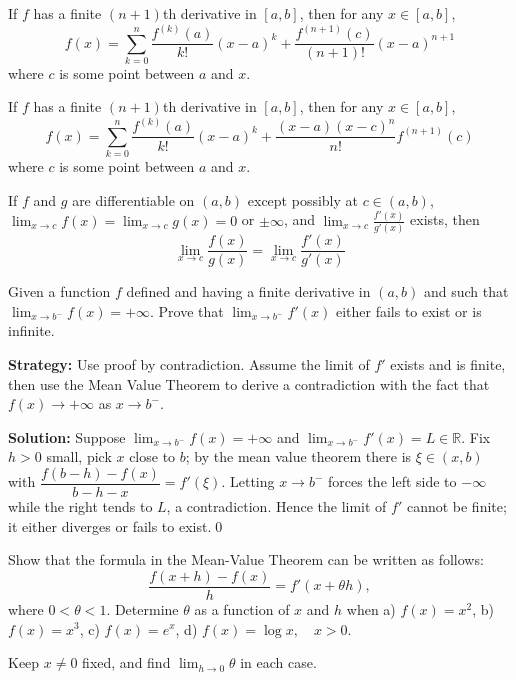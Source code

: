 \begin{theorem}
If $f$ has a finite $(n+1)$th derivative in $[a,b]$, then for any $x \in [a,b]$,
\[ f(x) = \sum_{k=0}^{n} \frac{f^{(k)}(a)}{k!} (x-a)^k + \frac{f^{(n+1)}(c)}{(n+1)!} (x-a)^{n+1} \]
where $c$ is some point between $a$ and $x$.
\end{theorem}

\begin{theorem}
If $f$ has a finite $(n+1)$th derivative in $[a,b]$, then for any $x \in [a,b]$,
\[ f(x) = \sum_{k=0}^{n} \frac{f^{(k)}(a)}{k!} (x-a)^k + \frac{(x-a)(x-c)^n}{n!} f^{(n+1)}(c) \]
where $c$ is some point between $a$ and $x$.
\end{theorem}

\begin{theorem}
If $f$ and $g$ are differentiable on $(a,b)$ except possibly at $c \in (a,b)$, $\lim_{x \to c} f(x) = \lim_{x \to c} g(x) = 0$ or $\pm\infty$, and $\lim_{x \to c} \frac{f'(x)}{g'(x)}$ exists, then
\[ \lim_{x \to c} \frac{f(x)}{g(x)} = \lim_{x \to c} \frac{f'(x)}{g'(x)} \]
\end{theorem}

\begin{problembox}
Given a function \( f \) defined and having a finite derivative in \( (a, b) \) and such that \( \lim_{x \to b^-} f(x) = +\infty \). Prove that \( \lim_{x \to b^-} f'(x) \) either fails to exist or is infinite.
\end{problembox}

\noindent\textbf{Strategy:} Use proof by contradiction. Assume the limit of \( f' \) exists and is finite, then use the Mean Value Theorem to derive a contradiction with the fact that \( f(x) \to +\infty \) as \( x \to b^- \).

\bigskip\noindent\textbf{Solution:}
Suppose $\lim_{x\to b^-}f(x)=+\infty$ and $\lim_{x\to b^-}f'(x)=L\in\mathbb{R}$. Fix $h>0$ small, pick $x$ close to $b$; by the mean value theorem there is $\xi\in(x,b)$ with $\dfrac{f(b-h)-f(x)}{b-h-x}=f'(\xi)$. Letting $x\to b^-$ forces the left side to $-\infty$ while the right tends to $L$, a contradiction. Hence the limit of $f'$ cannot be finite; it either diverges or fails to exist.\qed


\begin{problembox}
Show that the formula in the Mean-Value Theorem can be written as follows:
\[ \frac{f(x+h)-f(x)}{h} = f'(x+\theta h), \]
where \( 0 < \theta < 1 \). Determine \( \theta \) as a function of \( x \) and \( h \) when 
a) \( f(x) = x^2 \), 
b) \( f(x) = x^3 \), 
c) \( f(x) = e^x \), 
d) \( f(x) = \log x, \quad x > 0 \).

Keep \( x \neq 0 \) fixed, and find \( \lim_{h \to 0} \theta \) in each case.
\end{problembox}

